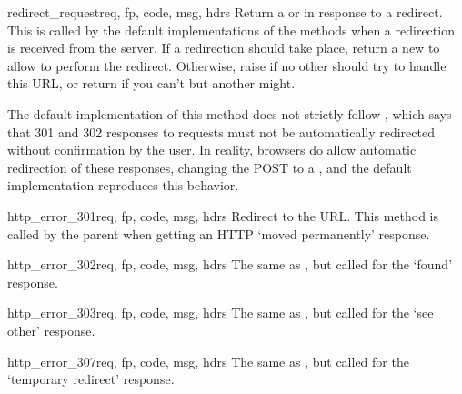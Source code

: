 \begin{methoddesc}[HTTPRedirectHandler]{redirect_request}{req,
                                                  fp, code, msg, hdrs}
Return a  or  in response to a redirect.
This is called by the default implementations of the
 methods when a redirection is received
from the server.  If a redirection should take place, return a new
 to allow  to perform the
redirect.  Otherwise, raise  if no other
 should try to handle this URL, or return 
if you can't but another  might.

\begin{notice}
 The default implementation of this method does not strictly
 follow , which says that 301 and 302 responses to 
 requests must not be automatically redirected without confirmation by
 the user.  In reality, browsers do allow automatic redirection of
 these responses, changing the POST to a , and the default
 implementation reproduces this behavior.
\end{notice}
\end{methoddesc}


\begin{methoddesc}[HTTPRedirectHandler]{http_error_301}{req,
                                                  fp, code, msg, hdrs}
Redirect to the  URL.  This method is called by
the parent  when getting an HTTP
`moved permanently' response.
\end{methoddesc}

\begin{methoddesc}[HTTPRedirectHandler]{http_error_302}{req,
                                                  fp, code, msg, hdrs}
The same as , but called for the
`found' response.
\end{methoddesc}

\begin{methoddesc}[HTTPRedirectHandler]{http_error_303}{req,
                                                  fp, code, msg, hdrs}
The same as , but called for the
`see other' response.
\end{methoddesc}

\begin{methoddesc}[HTTPRedirectHandler]{http_error_307}{req,
                                                  fp, code, msg, hdrs}
The same as , but called for the
`temporary redirect' response.
\end{methoddesc}


